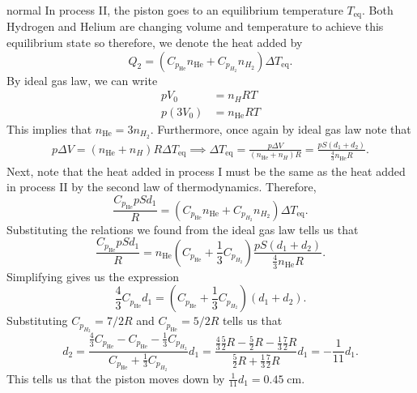 \begin{solution}{normal}
In process II, the piston goes to an equilibrium temperature $T_{\text{eq}}$. Both Hydrogen and Helium are changing volume and temperature to achieve this equilibrium state so therefore, we denote the heat added by 
\[Q_2 = (C_{p_{\text{He}}} n_{\text{He}} + C_{p_{H_2}} n_{H_2})\Delta T_{\text{eq}}.\]
By ideal gas law, we can write
\begin{align*}
pV_0 &= n_H RT \\
p(3V_0) &= n_{\text{He}} RT
\end{align*}
This implies that $n_{\text{He}} = 3n_{H_2}$. Furthermore, once again by ideal gas law note that 
\begin{align*}
p\Delta V = (n_{\text{He}} + n_H)R\Delta T_{\text{eq}} \implies \Delta T_{\text{eq}} = \frac{p\Delta V}{(n_{\text{He}} + n_H)R} = \frac{pS (d_1 + d_2)}{\frac{4}{3}n_{\text{He}} R}.
\end{align*}
Next, note that the heat added in process I must be the same as the heat added in process II by the second law of thermodynamics. Therefore, 
\[\frac{C_{p_{\text{He}}} p S d_1}{R} = (C_{p_{\text{He}}} n_{\text{He}} + C_{p_{H_2}} n_{H_2})\Delta T_{\text{eq}}.\]
Substituting the relations we found from the ideal gas law tells us that 
\[\frac{C_{p_{\text{He}}} p S d_1}{R} = n_{\text{He}}(C_{p_{\text{He}}} + \frac{1}{3}C_{p_{H_2}})\frac{pS (d_1 + d_2)}{\frac{4}{3}n_{\text{He}} R}.\]
Simplifying gives us the expression 
\[\frac{4}{3}C_{p_{\text{He}}} d_1 = (C_{p_{\text{He}}} + \frac{1}{3}C_{p_{H_2}})(d_1 + d_2).\]
Substituting $C_{p_{H_2}} = 7/2R$ and $C_{p_{\text{He}}} = 5/2R$ tells us that 
\[d_2 = \frac{\frac{4}{3}C_{p_{\text{He}}} - C_{p_{\text{He}}} - \frac{1}{3}C_{p_{H_2}}}{C_{p_{\text{He}}} + \frac{1}{3}C_{p_{H_2}}}d_1 = \frac{\frac{4}{3}\frac{5}{2}R - \frac{5}{2}R - \frac{1}{3}\frac{7}{2}R}{\frac{5}{2}R + \frac{1}{3}\frac{7}{2}R}d_1 = -\frac{1}{11}d_1.\]
This tells us that the piston moves down by $\frac{1}{11}d_1 = 0.45\;\mathrm{cm}$.
\end{solution}